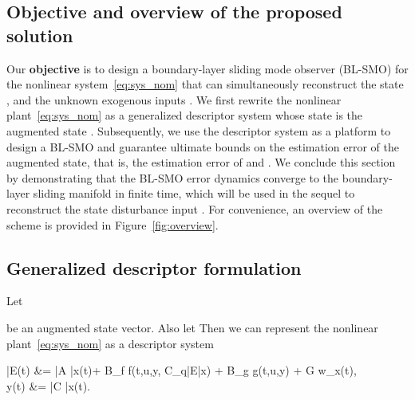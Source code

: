 \documentclass[times, doublespace]{rncauth}
\begin{document}
\subsection{Objective and overview of the proposed solution}
Our \textbf{objective} is to design a boundary-layer sliding mode observer (BL-SMO) for the nonlinear system~\eqref{eq:sys_nom} that can simultaneously reconstruct the state , and the unknown exogenous inputs . We first rewrite the nonlinear plant~\eqref{eq:sys_nom} as a generalized descriptor system whose state is the augmented state . Subsequently, we use the descriptor system as a platform to design a BL-SMO and guarantee ultimate bounds on the estimation error of the augmented state, that is, the estimation error of  and . We conclude this section by demonstrating that the BL-SMO error dynamics converge to the boundary-layer sliding manifold in finite time, which will be used in the sequel to reconstruct the state disturbance input .
For convenience, an overview of the scheme is provided in Figure~\ref{fig:overview}.
\subsection{Generalized descriptor formulation}
Let

be an augmented state vector. Also let 
Then we can represent the nonlinear plant~\eqref{eq:sys_nom} as a descriptor system

	\label{eq:descr_sys_a}
	\bar E(t) &= \bar A \bar x(t)+ B_f f(t,u,y, C_q\bar E\bar x) + B_g g(t,u,y) + G w_x(t),\\
	y(t) &= \bar C \bar x(t).
	
\end{document}
